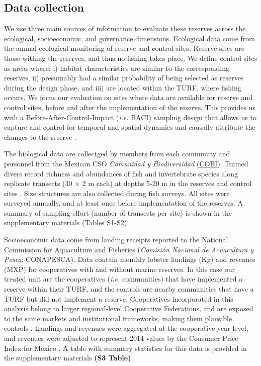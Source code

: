 \documentclass{frontiersSCNS}
\begin{document}
\hypertarget{data-collection}{%
\subsection{Data collection}\label{data-collection}}

We use three main sources of information to evaluate these reserves
across the ecological, socioeconomic, and governance dimensions.
Ecological data come from the annual ecological monitoring of reserve
and control sites. Reserve sites are those withing the reserves, and
thus no fishing takes place. We define control sites as areas where: i)
habitat characteristics are similar to the corresponding reserves, ii)
presumably had a similar probability of being selected as reserves
during the design phase, and iii) are located within the TURF, where
fishing occurs. We focus our evaluation on sites where data are
available for reserve and control sites, before and after the
implementation of the reserve. This provides us with a
Before-After-Control-Impact (\emph{i.e.} BACI) sampling design that
allows us to capture and control for temporal and spatial dynamics
\citep{stewartoaten_1986,depalma_2018} and causally attribute the
changes to the reserve
\citep{francinifilho_2008,moland_2013,Villasenor-Derbez_2018}.

The biological data are collectged by members from each community and
personnel from the Mexican CSO \emph{Comunidad y Biodiversidad}
(\href{www.cobi.org.mx}{COBI}). Trained divers record richness and
abundances of fish and invertebrate species along replicate transects
(30 \(\times\) 2 m each) at depths 5-20 m in the reserves and control
sites \citep{fulton_2018,fulton_2019,suman_2010-ez}. Size structures are
also collected during fish surveys. All sites were surveyed annually,
and at least once before implementation of the reserves. A summary of
sampling effort (number of transects per site) is shown in the
supplementary materials (Tables S1-S2).

Socioeconomic data come from landing receipts reported to the National
Commission for Aquaculture and Fisheries (\emph{Comisión Nacional de
Acuacultura y Pesca}; CONAPESCA). Data contain monthly lobster landings
(Kg) and revenues (MXP) for cooperatives with and without marine
reserves. In this case our treated unit are the cooperatives
(\emph{i.e.} communities) that have implemented a reserve within their
TURF, and the controls are nearby communities that have a TURF but did
not implement a reserve. Cooperatives incorporated in this analysis
belong to larger regional-level Cooperative Federations, and are exposed
to the same markets and institutional frameworks, making them plausible
controls \citep{mccay_2017,ayer_2018}. Landings and revenues were
aggregated at the cooperative-year level, and revenues were adjusted to
represent 2014 values by the Consumer Price Index for Mexico
\citep{oecd_2017}. A table with summary statistics for this data is
provided in the supplementary materials \textbf{(S3 Table)}.
\end{document}
